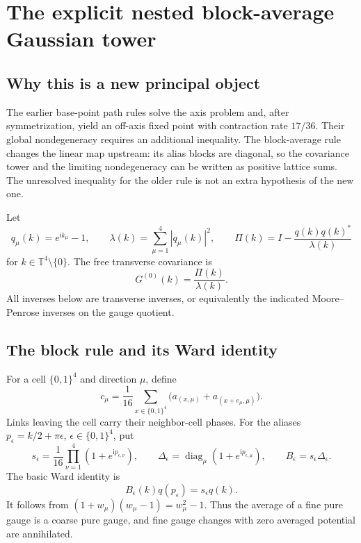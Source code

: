 \documentclass[11pt,oneside,openany]{book}
\theoremstyle{definition}
\theoremstyle{remark}
\newcommand{\T}{\mathbb T}
\newcommand{\ii}{\mathrm i}
\newcommand{\diag}{\operatorname{diag}}
\newcommand{\src}[2]{\cite[#2]{#1}}
\begin{document}
\chapter{The explicit nested block-average Gaussian tower}
\label{ch:tower}
\section{Why this is a new principal object}
The earlier base-point path rules solve the axis problem and, after symmetrization, yield an off-axis fixed point with contraction rate $17/36$. Their global nondegeneracy requires an additional inequality. The block-average rule changes the linear map upstream: its alias blocks are diagonal, so the covariance tower and the limiting nondegeneracy can be written as positive lattice sums. The unresolved inequality for the older rule is not an extra hypothesis of the new one. \src{F11}{V32--V37}

Let
\begin{equation}\label{eq:qPi}
q_\mu(k)=e^{\ii k_\mu}-1,\qquad
\lambda(k)=\sum_{\mu=1}^{4}|q_\mu(k)|^2,
\qquad \Pi(k)=I-\frac{q(k)q(k)^*}{\lambda(k)}
\end{equation}
for $k\in\T^4\setminus\{0\}$. The free transverse covariance is
\[
G^{(0)}(k)=\frac{\Pi(k)}{\lambda(k)}.
\]
All inverses below are transverse inverses, or equivalently the indicated Moore--Penrose inverses on the gauge quotient.

\section{The block rule and its Ward identity}
For a cell $\{0,1\}^4$ and direction $\mu$, define
\begin{equation}\label{eq:block-average}
c_\mu=\frac1{16}\sum_{x\in\{0,1\}^4}
\bigl(a_{(x,\mu)}+a_{(x+e_\mu,\mu)}\bigr).
\end{equation}
Links leaving the cell carry their neighbor-cell phases. For the aliases $p_\epsilon=k/2+\pi\epsilon$, $\epsilon\in\{0,1\}^4$, put
\begin{equation}\label{eq:alias-B}
s_\epsilon=\frac1{16}\prod_{\nu=1}^{4}(1+e^{\ii p_{\epsilon,\nu}}),
\qquad
\Delta_\epsilon=\diag_\mu(1+e^{\ii p_{\epsilon,\mu}}),
\qquad B_\epsilon=s_\epsilon\Delta_\epsilon.
\end{equation}
The basic Ward identity is
\begin{equation}\label{eq:block-Ward}
B_\epsilon(k)q(p_\epsilon)=s_\epsilon q(k).
\end{equation}
It follows from $(1+w_\mu)(w_\mu-1)=w_\mu^2-1$. Thus the average of a fine pure gauge is a coarse pure gauge, and fine gauge changes with zero averaged potential are annihilated.
\end{document}
